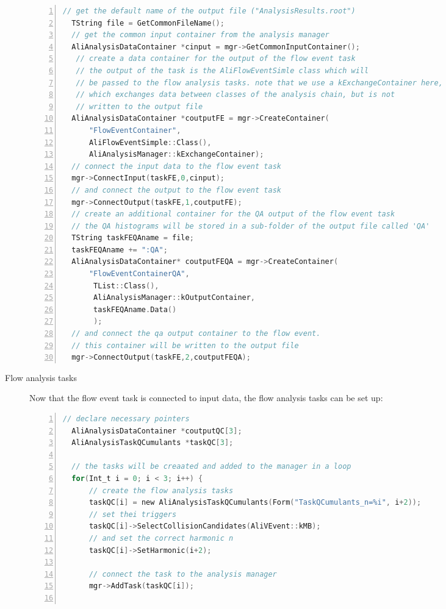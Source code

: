 \documentclass[a4paper]{book}
\numberwithin{equation}{subsection}
\begin{document}
\begin{description}
\begin{lstlisting}[language=C, numbers=left]
  // get the default name of the output file ("AnalysisResults.root")
  TString file = GetCommonFileName();
  // get the common input container from the analysis manager
  AliAnalysisDataContainer *cinput = mgr->GetCommonInputContainer();
   // create a data container for the output of the flow event task  
   // the output of the task is the AliFlowEventSimle class which will
   // be passed to the flow analysis tasks. note that we use a kExchangeContainer here,
   // which exchanges data between classes of the analysis chain, but is not
   // written to the output file
  AliAnalysisDataContainer *coutputFE = mgr->CreateContainer(
      "FlowEventContainer",
      AliFlowEventSimple::Class(),
      AliAnalysisManager::kExchangeContainer);
  // connect the input data to the flow event task
  mgr->ConnectInput(taskFE,0,cinput);
  // and connect the output to the flow event task
  mgr->ConnectOutput(taskFE,1,coutputFE);
  // create an additional container for the QA output of the flow event task
  // the QA histograms will be stored in a sub-folder of the output file called 'QA'
  TString taskFEQAname = file;
  taskFEQAname += ":QA";
  AliAnalysisDataContainer* coutputFEQA = mgr->CreateContainer(
      "FlowEventContainerQA",
       TList::Class(),
       AliAnalysisManager::kOutputContainer,
       taskFEQAname.Data()       
       );
  // and connect the qa output container to the flow event. 
  // this container will be written to the output file
  mgr->ConnectOutput(taskFE,2,coutputFEQA);\end{lstlisting}
  \item [Flow analysis tasks]
Now that the flow event task is connected to input data, the flow analysis tasks can be set up:
\begin{lstlisting}[language=C, numbers=left]
  // declare necessary pointers
  AliAnalysisDataContainer *coutputQC[3];
  AliAnalysisTaskQCumulants *taskQC[3];

  // the tasks will be creaated and added to the manager in a loop
  for(Int_t i = 0; i < 3; i++) {
      // create the flow analysis tasks
      taskQC[i] = new AliAnalysisTaskQCumulants(Form("TaskQCumulants_n=%i", i+2));
      // set thei triggers 
      taskQC[i]->SelectCollisionCandidates(AliVEvent::kMB);
      // and set the correct harmonic n
      taskQC[i]->SetHarmonic(i+2);

      // connect the task to the analysis manager
      mgr->AddTask(taskQC[i]);


\end{lstlisting}
\end{description}
\end{document}
